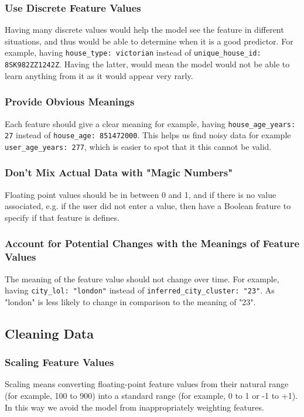 \documentclass[12pt]{article}
\begin{document}
\subsubsection{Use Discrete Feature Values}
Having many discrete values would help the model see the feature in different situations, and thus would be able to determine when it is a good predictor.
For example, having {\tt{house\_type: victorian}} instead of {\tt{unique\_house\_id: 8SK982ZZ1242Z}}. Having the latter, would mean the model would not be able to learn anything from it as it would appear very rarly.
\subsubsection{Provide Obvious Meanings}
Each feature should give a clear meaning for example, having {\tt{house\_age\_years: 27}} instead of {\tt{house\_age: 851472000}}. This helps us find noisy data for example {\tt{user\_age\_years: 277}}, which is easier to spot that it this cannot be valid.
\subsubsection{Don't Mix Actual Data with "Magic Numbers"}
Floating point values should be in between 0 and 1, and if there is no value associated, e.g. if the user did not enter a value, then have a Boolean feature to specify if that feature is defines.
\subsubsection{Account for Potential Changes with the Meanings of Feature Values}
The meaning of the feature value should not change over time. For example, having {\tt{city\_lol: "london"}} instead of {\tt{inferred\_city\_cluster: "23"}}. As "london" is less likely to change in comparison to the meaning of "23".

\subsection{Cleaning Data}
\subsubsection{Scaling Feature Values}
Scaling means converting floating-point feature values from their natural range (for example, 100 to 900) into a standard range (for example, 0 to 1 or -1 to +1). In this way we avoid the model from inappropriately weighting features. 
\end{document}
